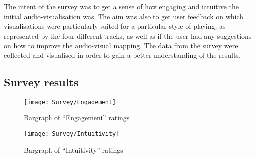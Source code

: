 \documentclass[../initial_thesis.tex]{subfiles}
\begin{document}


The intent of the survey was to get a sense of how engaging and intuitive the initial audio-visualisation was. The aim was also to get user feedback on which visualisations were particularly suited for a particular style of playing, as represented by the four different tracks, as well as if the user had any suggestions on how to improve the audio-visual mapping. The data from the survey were collected and visualised in order to gain a better understanding of the results.

\subsection{Survey results}

\begin{figure}
  \texttt{[image: Survey/Engagement]}
  \caption{Bargraph of ``Engagement'' ratings}
\end{figure}

\begin{figure}
  \texttt{[image: Survey/Intuitivity]}
  \caption{Bargraph of ``Intuitivity'' ratings}
\end{figure}
\end{document}
